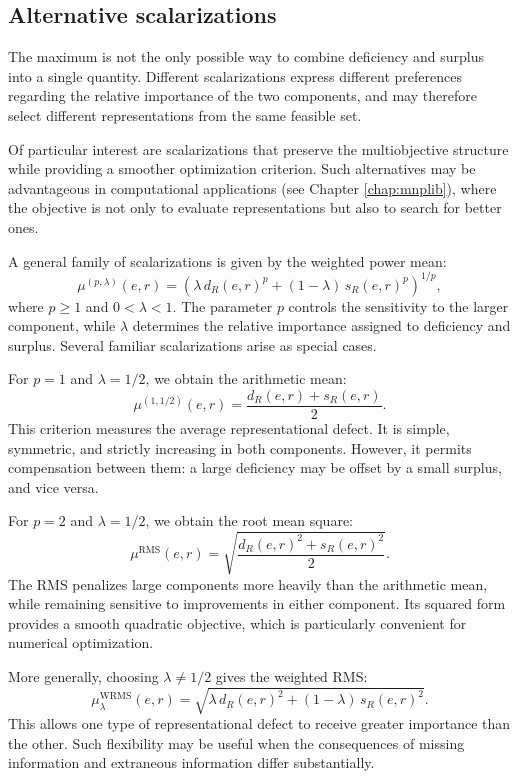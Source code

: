 \subsection*{Alternative scalarizations}

The maximum is not the only possible way to combine deficiency and surplus into a single quantity. Different scalarizations express different preferences regarding the relative importance of the two components, and may therefore select different representations from the same feasible set.

Of particular interest are scalarizations that preserve the multiobjective structure while providing a smoother optimization criterion. Such alternatives may be advantageous in computational applications (see Chapter \ref{chap:mnplib}), where the objective is not only to evaluate representations but also to search for better ones.

A general family of scalarizations is given by the weighted power mean:
\[
\mu^{(p,\lambda)}(e,r) = \left(\lambda\,d_R(e,r)^p + (1-\lambda)\,s_R(e,r)^p \right)^{1/p},
\]
where $p\ge 1$ and $0<\lambda<1$. The parameter $p$ controls the sensitivity to the larger component, while $\lambda$ determines the relative importance assigned to deficiency and surplus. Several familiar scalarizations arise as special cases.

For $p=1$ and $\lambda=1/2$, we obtain the arithmetic mean:
\[
\mu^{(1,1/2)}(e,r) = \frac{d_R(e,r)+s_R(e,r)}{2}.
\]
This criterion measures the average representational defect. It is simple, symmetric, and strictly increasing in both components. However, it permits compensation between them: a large deficiency may be offset by a small surplus, and vice versa.

For $p=2$ and $\lambda=1/2$, we obtain the root mean square:
\[
\mu^{\mathrm{RMS}}(e,r) = \sqrt{ \frac{ d_R(e,r)^2+s_R(e,r)^2}{2} }.
\]
The RMS penalizes large components more heavily than the arithmetic mean, while remaining sensitive to improvements in either component. Its squared form provides a smooth quadratic objective, which is particularly convenient for numerical optimization.

More generally, choosing $\lambda\neq 1/2$ gives the weighted RMS:
\[
\mu^{\mathrm{WRMS}}_\lambda(e,r) = \sqrt{\lambda\,d_R(e,r)^2 + (1-\lambda)\,s_R(e,r)^2 }.
\]
This allows one type of representational defect to receive greater importance than the other. Such flexibility may be useful when the consequences of missing information and extraneous information differ substantially.

